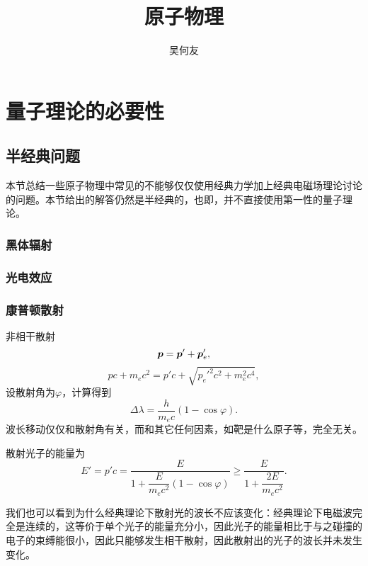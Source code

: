 \documentclass[UTF8, a4paper]{ctexart}
\title{原子物理}
\author{吴何友}
\begin{document}
\maketitle


\section{量子理论的必要性}

\subsection{半经典问题}

本节总结一些原子物理中常见的不能够仅仅使用经典力学加上经典电磁场理论讨论的问题。本节给出的解答仍然是半经典的，也即，并不直接使用第一性的量子理论。

\subsubsection{黑体辐射}


\subsubsection{光电效应}

\subsubsection{康普顿散射}

非相干散射
\[
    \vb*{p} = \vb*{p}' + \vb*{p}'_e,
\]
\[
    pc + m_e c^2 = p' c + \sqrt{{p_e'}^2 c^2 + m_e^2 c^4},
\]
设散射角为$\varphi$，计算得到
\begin{equation}
    \Delta \lambda = \frac{h}{m_e c} (1 - \cos \varphi).
\end{equation}
波长移动仅仅和散射角有关，而和其它任何因素，如靶是什么原子等，完全无关。

散射光子的能量为
\begin{equation}
    E' = p'c = \frac{E}{1 + \dfrac{E}{m_e c^2}(1 - \cos \varphi)} \geq \frac{E}{1 + \dfrac{2 E}{m_e c^2}}.
\end{equation}

我们也可以看到为什么经典理论下散射光的波长不应该变化：经典理论下电磁波完全是连续的，这等价于单个光子的能量充分小，因此光子的能量相比于与之碰撞的电子的束缚能很小，因此只能够发生相干散射，因此散射出的光子的波长并未发生变化。
\end{document}
